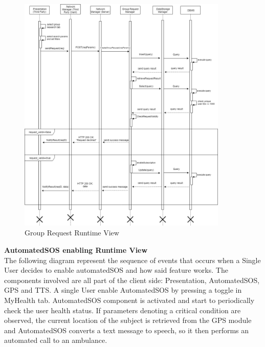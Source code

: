 \documentclass[titlepage]{article}
\begin{document}
\begin{figure}[H]
	\center
  	\includegraphics[width=10cm]{GroupRequest.png} %
  	\caption{Group Request Runtime View}
 	\label{fig:GRPREQ}
\end{figure}


{\bf AutomatedSOS enabling Runtime View }\\ 
The following diagram represent the sequence of events that occurs when a Single User decides to enable automatedSOS and how said feature works.
The components involved are all part of the client side: Presentation, AutomatedSOS, GPS and TTS. A single User enable AutomatedSOS by pressing a toggle in MyHealth tab.
AutomatedSOS component is activated and start to periodically check the user health status. If parameters denoting a critical condition are observed, the current location of the subject is retrieved from the GPS module and AutomatedSOS converts a text message to speech, so it then performs an automated call to an ambulance.
\end{document}
